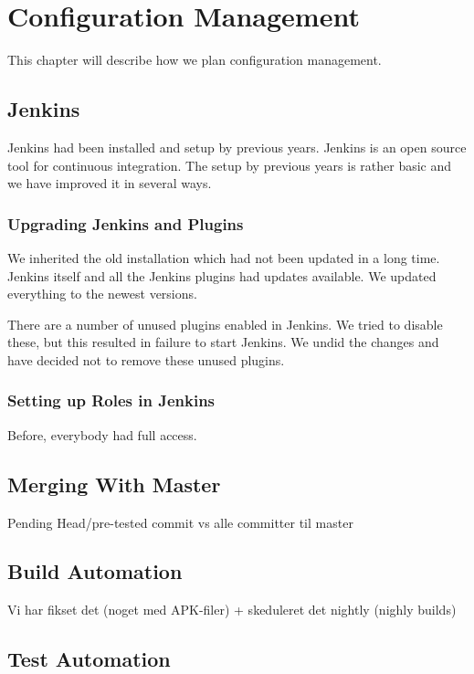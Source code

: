 \chapter{Configuration Management}%
This chapter will describe how we plan configuration management.

\section{Jenkins}
Jenkins had been installed and setup by previous years. Jenkins is an open source tool for continuous integration. The setup by previous years is rather basic and we have improved it in several ways.

\subsection{Upgrading Jenkins and Plugins}
We inherited the old installation which had not been updated in a long time. Jenkins itself and all the Jenkins plugins had updates available. We updated everything to the newest versions.

There are a number of unused plugins enabled in Jenkins. We tried to disable these, but this resulted in failure to start Jenkins. We undid the changes and have decided not to remove these unused plugins.

\subsection{Setting up Roles in Jenkins}
Before, everybody had full access.

\section{Merging With Master}
Pending Head/pre-tested commit vs alle committer til master

\section{Build Automation}
Vi har fikset det (noget med APK-filer) + skeduleret det nightly (nighly builds)

\section{Test Automation}
